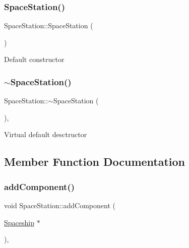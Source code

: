 \subsubsection{\texorpdfstring{Space\+Station()}{SpaceStation()}\hspace{0.1cm}{\footnotesize\ttfamily [2/2]}}
{\footnotesize\ttfamily Space\+Station\+::\+Space\+Station (\begin{DoxyParamCaption}{ }\end{DoxyParamCaption})\hspace{0.3cm}{\ttfamily [protected]}}

Default constructor \mbox{\label{classSpaceStation_ab14cf2bd79032be8342f6475911bd64b}} 
\subsubsection{\texorpdfstring{$\sim$\+Space\+Station()}{~SpaceStation()}}
{\footnotesize\ttfamily Space\+Station\+::$\sim$\+Space\+Station (\begin{DoxyParamCaption}{ }\end{DoxyParamCaption})\hspace{0.3cm}{\ttfamily [protected]}, {\ttfamily [virtual]}}

Virtual default desctructor 

\subsection{Member Function Documentation}
\mbox{\label{classSpaceStation_af78aa518f63655701ff763461522ac7d}} 
\subsubsection{\texorpdfstring{add\+Component()}{addComponent()}}
{\footnotesize\ttfamily void Space\+Station\+::add\+Component (\begin{DoxyParamCaption}\item[{\hyperlink{classSpaceship}{Spaceship} $\ast$}]{ }\end{DoxyParamCaption})\hspace{0.3cm}{\ttfamily [inline]}, {\ttfamily [virtual]}}

